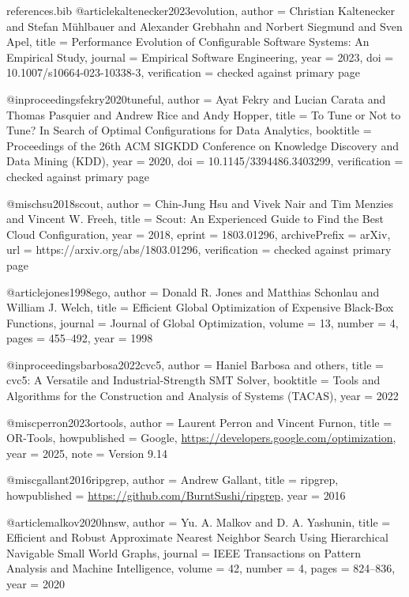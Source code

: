 \begin{filecontents*}[overwrite]{references.bib}
@article{kaltenecker2023evolution,
  author = {Christian Kaltenecker and Stefan M{\"u}hlbauer and Alexander Grebhahn and Norbert Siegmund and Sven Apel},
  title = {Performance Evolution of Configurable Software Systems: An Empirical Study},
  journal = {Empirical Software Engineering},
  year = {2023},
  doi = {10.1007/s10664-023-10338-3},
  verification = {checked against primary page}
}

@inproceedings{fekry2020tuneful,
  author = {Ayat Fekry and Lucian Carata and Thomas Pasquier and Andrew Rice and Andy Hopper},
  title = {To Tune or Not to Tune? {I}n Search of Optimal Configurations for Data Analytics},
  booktitle = {Proceedings of the 26th ACM SIGKDD Conference on Knowledge Discovery and Data Mining (KDD)},
  year = {2020},
  doi = {10.1145/3394486.3403299},
  verification = {checked against primary page}
}

@misc{hsu2018scout,
  author = {Chin-Jung Hsu and Vivek Nair and Tim Menzies and Vincent W. Freeh},
  title = {Scout: An Experienced Guide to Find the Best Cloud Configuration},
  year = {2018},
  eprint = {1803.01296},
  archivePrefix = {arXiv},
  url = {https://arxiv.org/abs/1803.01296},
  verification = {checked against primary page}
}

@article{jones1998ego,
  author = {Donald R. Jones and Matthias Schonlau and William J. Welch},
  title = {Efficient Global Optimization of Expensive Black-Box Functions},
  journal = {Journal of Global Optimization},
  volume = {13},
  number = {4},
  pages = {455--492},
  year = {1998}
}

@inproceedings{barbosa2022cvc5,
  author = {Haniel Barbosa and others},
  title = {cvc5: A Versatile and Industrial-Strength {SMT} Solver},
  booktitle = {Tools and Algorithms for the Construction and Analysis of Systems (TACAS)},
  year = {2022}
}

@misc{perron2023ortools,
  author = {Laurent Perron and Vincent Furnon},
  title = {{OR-Tools}},
  howpublished = {Google, \url{https://developers.google.com/optimization}},
  year = {2025},
  note = {Version 9.14}
}

@misc{gallant2016ripgrep,
  author = {Andrew Gallant},
  title = {ripgrep},
  howpublished = {\url{https://github.com/BurntSushi/ripgrep}},
  year = {2016}
}

@article{malkov2020hnsw,
  author = {Yu. A. Malkov and D. A. Yashunin},
  title = {Efficient and Robust Approximate Nearest Neighbor Search Using Hierarchical Navigable Small World Graphs},
  journal = {IEEE Transactions on Pattern Analysis and Machine Intelligence},
  volume = {42},
  number = {4},
  pages = {824--836},
  year = {2020}
}


\end{filecontents*}
